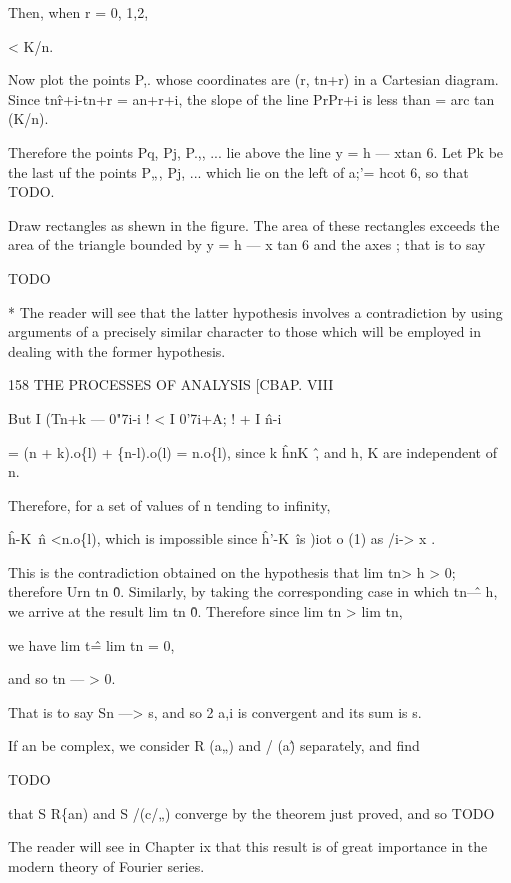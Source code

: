 Then, when r = 0, 1,2,



< K/n.




Now plot the points P,. whose coordinates are (r, tn+r) in a Cartesian
diagram. Since tn\^r+i-tn+r = an+r+i, the slope of the line PrPr+i is less
than = arc tan (K/n).

Therefore the points Pq, Pj, P.,, ... lie above the line y = h — xtan 6.
Let Pk be the last uf the points P„, Pj, ... which lie on the left of a;'= hcot 6,
so that TODO.

Draw rectangles as shewn in the figure. The area of these rectangles
exceeds the area of the triangle bounded by y = h — x tan 6 and the axes ;
that is to say

TODO

* The reader will see that the latter hypothesis involves a contradiction by using arguments
of a precisely similar character to those which will be employed in dealing with the former
hypothesis.



158 THE PROCESSES OF ANALYSIS [CBAP. VIII

But I (Tn+k — 0"7i-i ! < I 0'7i+A; ! + I \^n-i \

= (n + k).o\{l) + \{n-l).o(l)
= n.o\{l),
since k \^ hnK~\^, and h, K are independent of n.

Therefore, for a set of values of n tending to infinity,

\^h-K~\^n <n.o\{l),
which is impossible since \^h'-K~\^ is )iot o (1) as /i-> x .

This is the contradiction obtained on the hypothesis that lim tn> h > 0;
therefore Urn tn \^ 0. Similarly, by taking the corresponding case in which
tn\^ — h, we arrive at the result lim tn \^ 0. Therefore since lim tn > lim tn,

we have lim t\^ = lim tn = 0,

and so tn — > 0.

That is to say Sn —> s, and so 2 a,i is convergent and its sum is s.

If an be complex, we consider R (a„) and / (a\^) separately, and find

TODO

that S R\{an) and S /(c/„) converge by the theorem just proved, and so
TODO

The reader will see in Chapter ix that this result is of great importance
in the modern theory of Fourier series.


